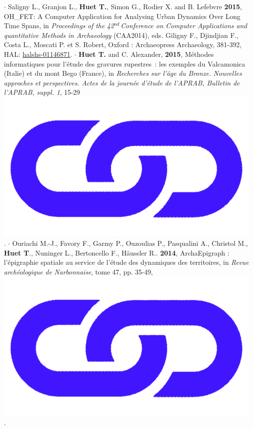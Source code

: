 \documentclass{article}
\begin{document}
\smallbreak
$\cdot$ Saligny L., Granjon L., \textbf{Huet T.}, Simon G., Rodier X. and B. Lefebvre \textbf{2015}, OH\_FET: A Computer Application for Analysing Urban Dynamics Over Long Time Spans, in\textit{ Proceedings of the 42${}^{nd\ }$Conference on Computer Applications and quantitative Methods in Archaeology} (CAA2014), eds\textit{. }Giligny F., Djindjian F., Costa L., Moscati P. et S. Robert, Oxford : Archaeopress Archaeology, 381-392, HAL: \href{https://hal.archives-ouvertes.fr/halshs-01146871}{halshs-01146871}.
\smallbreak
$\cdot$ \textbf{Huet T.} and C. Alexander, \textbf{2015}, M\'{e}thodes informatiques pour l'\'{e}tude des gravures rupestres~: les exemples du Valcamonica (Italie) et du mont Bego (France), in \textit{Recherches sur l'\^{a}ge du Bronze. Nouvelles approches et perspectives. Actes de la journ\'{e}e d'\'{e}tude de l'APRAB, Bulletin de l'APRAB, suppl. 1}, 15-29 
\href{https://www.researchgate.net/publication/347437308_Methodes_informatiques_pour_l'etude_des_gravures_rupestres_les_exemples_du_Valcamonica_Italie_et_du_mont_Bego_France}{\includegraphics[scale=0.02]{link_darkblue.png}}.
\smallbreak
$\cdot$ Ouriachi M.-J., Favory F., Garmy P., Ouzoulias P., Pasqualini A., Christol M., \textbf{Huet T}., Nuninger L., Bertoncello F., H\"{a}ussler R.. \textbf{2014}, ArchaEpigraph : l'\'{e}pigraphie spatiale au service de l'\'{e}tude des dynamiques des territoires, in \textit{Revue arch\'{e}ologique de Narbonnaise}, tome 47, pp. 35-49, \href{https://www.persee.fr/doc/ran_0557-7705_2014_num_47_1_1897}{\includegraphics[scale=0.02]{link_darkblue.png}}.
\end{document}
